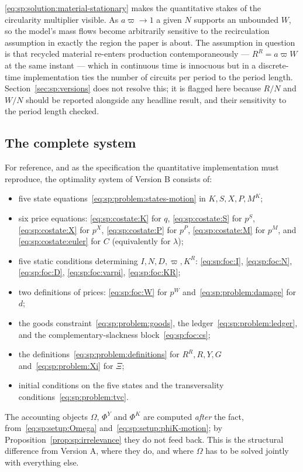  \eqref{eq:sp:solution:material-stationary} makes the
quantitative stakes of the circularity multiplier visible. As $a\varpi\to1$ a given $N$ supports an
unbounded $W$, so the model's mass flows become arbitrarily sensitive to the recirculation
assumption in exactly the region the paper is about. The assumption in question is that recycled
material re-enters production contemporaneously --- $R^R=a\varpi W$ at the same instant --- which in
continuous time is innocuous but in a discrete-time implementation ties the number of circuits per
period to the period length. Section~\ref{sec:sp:versions} does not resolve this; it is flagged here
because $R/N$ and $W/N$ should be reported alongside any headline result, and their sensitivity to
the period length checked.


\subsection{The complete system}\label{sec:sp:solution:system}

For reference, and as the specification the quantitative implementation must reproduce, the
optimality system of Version B consists of:
\begin{itemize}[leftmargin=1.6em,itemsep=0.15em]
\item five state equations~\eqref{eq:sp:problem:states-motion} in $K,S,X,P,M^K$;
\item six price equations: \eqref{eq:sp:costate:K} for $q$, \eqref{eq:sp:costate:S} for $p^S$,
\eqref{eq:sp:costate:X} for $p^X$, \eqref{eq:sp:costate:P} for $p^P$, \eqref{eq:sp:costate:M} for
$p^M$, and \eqref{eq:sp:costate:euler} for $C$ (equivalently for $\lambda$);
\item five static conditions determining $I,N,D,\varpi,K^R$:
\eqref{eq:sp:foc:I}, \eqref{eq:sp:foc:N}, \eqref{eq:sp:foc:D}, \eqref{eq:sp:foc:varpi},
\eqref{eq:sp:foc:KR};
\item two definitions of prices: \eqref{eq:sp:foc:W} for $p^W$ and~\eqref{eq:sp:problem:damage} for
$d$;
\item the goods constraint~\eqref{eq:sp:problem:goods}, the ledger~\eqref{eq:sp:problem:ledger}, and
the complementary-slackness block~\eqref{eq:sp:foc:cs};
\item the definitions~\eqref{eq:sp:problem:definitions} for $R^R,R,Y,G$ and~\eqref{eq:sp:problem:Xi}
for $\Xi$;
\item initial conditions on the five states and the transversality
conditions~\eqref{eq:sp:problem:tvc}.
\end{itemize}
The accounting objects $\Omega$, $\Phi^Y$ and $\Phi^K$ are computed \emph{after} the fact,
from~\eqref{eq:sp:setup:Omega} and~\eqref{eq:sp:setup:phiK-motion}; by
Proposition~\ref{prop:sp:irrelevance} they do not feed back. This is the structural difference from
Version A, where they do, and where $\Omega$ has to be solved jointly with everything else.
